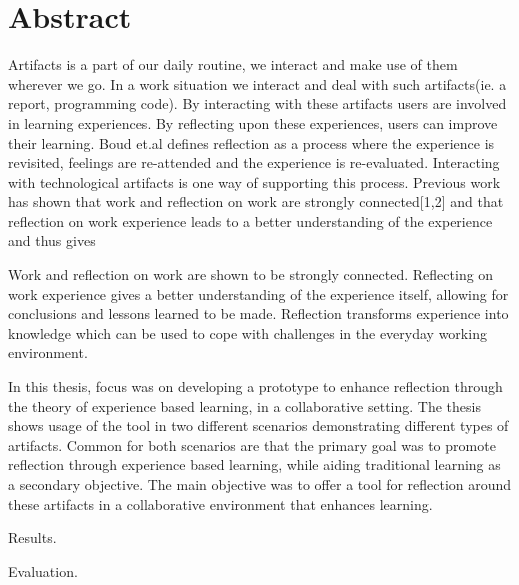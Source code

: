 \chapter*{Abstract}
Artifacts is a part of our daily routine, we interact and make use of them wherever we go. In a work situation we interact and deal with such artifacts(ie. a report, programming code). By interacting with these artifacts users are involved in learning experiences. By reflecting upon these experiences, users can improve their learning. Boud et.al defines reflection as a process where the experience is revisited, feelings are re-attended and the experience is re-evaluated\cite{boudreflection1985}. Interacting with technological artifacts is one way of supporting this process. Previous work has shown that work and reflection on work are strongly connected[1,2] and that reflection on work experience leads to a better understanding of the experience and thus gives

Work and reflection on work are shown to be strongly connected\cite{Schon1983,Chaiklin1993}. Reflecting on work experience gives a better understanding of the experience itself, allowing for conclusions and lessons learned to be made. 
Reflection transforms experience into knowledge which can be used to cope with challenges in the everyday working environment. 

In this thesis, focus was on developing a prototype to enhance reflection through the theory of experience based learning, in a collaborative setting. The thesis shows usage of the tool in two different scenarios demonstrating different types of artifacts. Common for both scenarios are that the primary goal was to promote reflection through experience based learning, while aiding traditional learning as a secondary objective. 
The main objective was to offer a tool for reflection around these artifacts in a collaborative environment that enhances learning. 

Results.

Evaluation.
